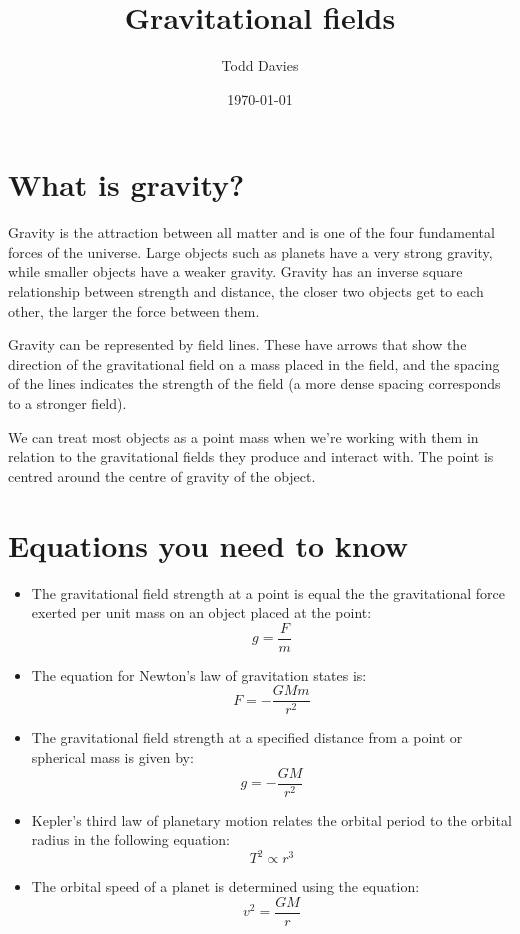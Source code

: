\documentclass{article}
\title{Gravitational fields}
\author{Todd Davies}
\date{\today}
\begin{document}
\lhead{\today}
\setlength{\parindent}{0cm}

\maketitle

\section*{What is gravity?}
\thispagestyle{empty}
Gravity is the attraction between all matter and is one of the four fundamental forces of the universe. Large objects such as planets have a very strong gravity, while smaller objects have a weaker gravity. Gravity has an inverse square relationship between strength and distance, the closer two objects get to each other, the larger the force between them.

Gravity can be represented by field lines. These have arrows that show the direction of the gravitational field on a mass placed in the field, and the spacing of the lines indicates the strength of the field (a more dense spacing corresponds to a stronger field).

We can treat most objects as a point mass when we're working with them in relation to the gravitational fields they produce and interact with. The point is centred around the centre of gravity of the object.


\section*{Equations you need to know}

\begin{itemize}
	\item The gravitational field strength at a point is equal the the gravitational force exerted per unit mass on an object placed at the point:
	\[
		g = \frac{F}{m}
	\]
	\item The equation for Newton's law of gravitation states is:
	\[
		F = -\frac{GMm}{r^2}
	\]
	\item The gravitational field strength at a specified distance from a point or spherical mass is given by:
	\[
		g = -\frac{GM}{r^2}
	\]
	\item Kepler's third law of planetary motion relates the orbital period to the orbital radius in the following equation:
	\[
		T^2 \propto r^3
	\]
	\item The orbital speed of a planet is determined using the equation:
	\[
		v^2 = \frac{GM}{r}
	\]
\end{itemize}
\end{document}
